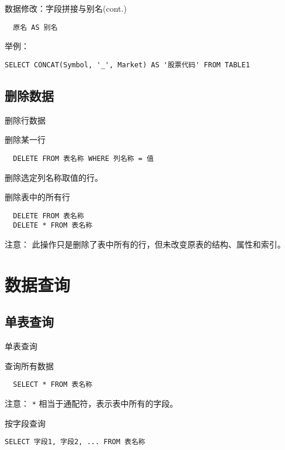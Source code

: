 \documentclass[t]{beamer}
\begin{document}
\begin{frame}[fragile]{数据修改：字段拼接与别名(cont.)}
\begin{lstlisting}
  原名 AS 别名
\end{lstlisting}
\begin{block}{举例：}
\begin{lstlisting}
SELECT CONCAT(Symbol, '_', Market) AS '股票代码' FROM TABLE1
\end{lstlisting}
\end{block}
\end{frame}

\subsection{删除数据}
\begin{frame}[fragile]{删除行数据}
\begin{block}{删除某一行}
\begin{lstlisting}
  DELETE FROM 表名称 WHERE 列名称 = 值
\end{lstlisting}
删除选定列名称取值的行。  
\end{block}
\begin{block}{删除表中的所有行}
\begin{lstlisting}
  DELETE FROM 表名称
  DELETE * FROM 表名称
\end{lstlisting}  
{注意：}
  此操作只是删除了表中所有的行，但未改变原表的结构、属性和索引。

\end{block}

\end{frame}


\section{数据查询}
\subsection{单表查询}
\begin{frame}[fragile]{单表查询}
\begin{block}{查询所有数据}
\begin{lstlisting}
  SELECT * FROM 表名称
\end{lstlisting}  
{注意：}
  \verb|*| 相当于通配符，表示表中所有的字段。 
\end{block}

\begin{block}{按字段查询}
\begin{lstlisting}
SELECT 字段1, 字段2, ... FROM 表名称
\end{lstlisting}
\end{block}
\end{frame}
\end{document}
